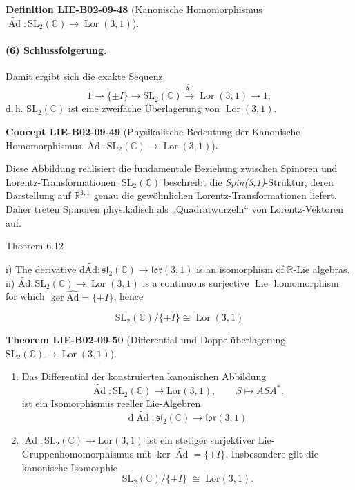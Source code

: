 \documentclass[10pt, letterpaper]{article}
\newcommand{\Ad}{\operatorname{Ad}}
\newcommand{\C}{\mathbb{C}}
\newcommand{\SL}{\mathrm{SL}}
\newcommand{\Lor}{\mathrm{Lor}}
\newcommand{\CustomHeading}[3]{%
  \par\medskip\noindent%
  \textbf{#1 #2} \textnormal{(#3)}.\enskip%
}
\newenvironment{DEF}[2]{\begin{unitbox}\CustomHeading{Definition}{#1}{#2}}{\end{unitbox}}
\newenvironment{THEO}[2]{\begin{unitbox}\CustomHeading{Theorem}{#1}{#2}}{\end{unitbox}}
\newenvironment{CONC}[2]{\begin{unitbox}\CustomHeading{Concept}{#1}{#2}}{\end{unitbox}}
\begin{document}
\begin{DEF}{LIE-B02-09-48}{Kanonische Homomorphismus \(\widetilde{\operatorname{Ad}}:\mathrm{SL}_2(\mathbb{C})\to \operatorname{Lor}(3,1)\)}
\paragraph{(6) Schlussfolgerung.}
Damit ergibt sich die exakte Sequenz
\[
1\longrightarrow\{\pm I\}\longrightarrow
\mathrm{SL}_2(\mathbb{C})
\overset{\widetilde{\operatorname{Ad}}}{\longrightarrow}
\operatorname{Lor}(3,1)
\longrightarrow 1,
\]
d.\,h. \(\mathrm{SL}_2(\mathbb{C})\) ist eine zweifache Überlagerung von \(\operatorname{Lor}(3,1)\).
\end{DEF}


\begin{CONC}{LIE-B02-09-49}{Physikalische Bedeutung der Kanonische Homomorphismus \(\widetilde{\operatorname{Ad}}:\mathrm{SL}_2(\mathbb{C})\to \operatorname{Lor}(3,1)\)}
Diese Abbildung realisiert die fundamentale Beziehung zwischen Spinoren und Lorentz-Transformationen:
\(\mathrm{SL}_2(\mathbb{C})\) beschreibt die \emph{Spin(3,1)}-Struktur,
deren Darstellung auf \(\mathbb{R}^{3,1}\) genau die gewöhnlichen Lorentz-Transformationen liefert.
Daher treten Spinoren physikalisch als „Quadratwurzeln“ von Lorentz-Vektoren auf.
\end{CONC}





Theorem 6.12


i) The derivative $\mathrm{d} \widetilde{\mathrm{Ad}}: \mathfrak{s l}_{2}(\mathbb{C}) \longrightarrow \mathfrak{l o r}(3,1)$ is an isomorphism of $\mathbb{R}$-Lie algebras. ii) $\widetilde{\mathrm{Ad}}: \mathrm{SL}_{2}(\mathbb{C}) \longrightarrow \operatorname{Lor}(3,1)$ is a continuous surjective $\operatorname{Lie}$ homomorphism for which $\operatorname{ker} \widehat{\mathrm{Ad}}=\{ \pm I\}$, hence

$$
\mathrm{SL}_{2}(\mathbb{C}) /\{ \pm I\} \cong \operatorname{Lor}(3,1)
$$





\begin{THEO}{LIE-B02-09-50}{Differential und Doppelüberlagerung \(\mathrm{SL}_2(\mathbb{C})\to \operatorname{Lor}(3,1)\)}
\begin{enumerate}[label=\textnormal{(\roman*)}]
\item Das Differential der konstruierten kanonischen Abbildung
\[
\widetilde{\Ad}:\SL_2(\C)\longrightarrow \Lor(3,1),
\qquad
S\mapsto ASA^*,
\]
ist ein Isomorphismus reeller Lie-Algebren
\[
\mathrm{d}\widetilde{\Ad}:\mathfrak{sl}_2(\C)\to\mathfrak{lor}(3,1)
\]
\item \(\widetilde{\Ad}:\SL_2(\C)\to \Lor(3,1)\) ist ein stetiger surjektiver Lie-Gruppenhomomorphismus
mit
\(\ker\widetilde{\Ad}=\{\pm I\}\). Insbesondere gilt die kanonische Isomorphie
\[
\SL_2(\C)/\{\pm I\}\;\cong\;\Lor(3,1).
\]
\end{enumerate}
\end{THEO}
\end{document}
